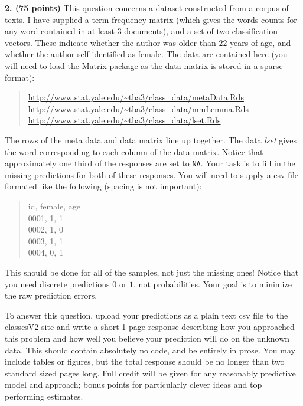 \documentclass[12pt]{article}
\begin{document}
{\bf 2. (75 points)} This question concerns a dataset constructed from a corpus of texts.
I have supplied a term frequency matrix (which gives the words counts for any word contained
in at least $3$ documents), and a set of two classification vectors. These indicate whether
the author was older than $22$ years of age, and whether the author self-identified as
female. The data are contained here (you will need to load the Matrix package as the
data matrix is stored in a sparse format):
\begin{quote}
\url{http://www.stat.yale.edu/~tba3/class_data/metaData.Rds}\\
\url{http://www.stat.yale.edu/~tba3/class_data/mmLemma.Rds}\\
\url{http://www.stat.yale.edu/~tba3/class_data/lset.Rds}
\end{quote}
The rows of the meta data and data matrix line up together. The data \textit{lset} gives the word
corresponding to each column of the data matrix. Notice that approximately one third of the
responses are set to \texttt{NA}. Your task is
to fill in the missing predictions for both of these responses. You will need to supply
a csv file formated like the following (spacing is not important):
\begin{quote}
id,      female, age\\
0001,      1, 1\\
0002,      1, 0\\
0003,      1, 1\\
0004,      0, 1
\end{quote}
This should be done for all of the samples, not just the missing ones! Notice that you need
discrete predictions $0$ or $1$, not probabilities. Your goal is to minimize the raw
prediction errors.

To answer this question, upload your predictions as a plain text csv file to the classesV2
site and write a short 1 page response describing how you approached this problem and how
well you believe your prediction will do on the unknown data. This should contain absolutely
no code, and be entirely in prose. You may include tables or figures, but the total response
should be no longer than two standard sized pages long.
Full credit will be given for any reasonably predictive model and approach; bonus points for
particularly clever ideas and top performing estimates.
\end{document}
